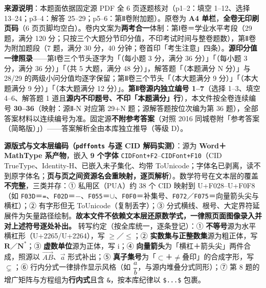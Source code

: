 


\begin{gktip}
\textbf{来源说明}：本题面依据固定源 PDF 全 6 页逐题核对（p1–2：填空 1–12、选择 13–24；p3–4：解答 25–29；p5–6：第Ⅱ卷附加题）。原卷为 \textbf{A4 单栏}，\textbf{全卷无印刷页码}（6 页页脚均空白）。卷内文案为\textbf{两考合一}体制：第Ⅰ卷＝学业水平考段（29 题，满分 120 分；只按三个大题分节印分值，不印考试时间与整卷题数），第Ⅱ卷为附加题段（7 题，满分 30 分，40 分钟；卷首印「考生注意」四条）。\textbf{源印分值一律照录}——第Ⅰ卷三个节头逐字为「（每小题 3 分，满分 36 分）」「（每小题 3 分，满分 36 分）」「（共 5 大题，满分 48 分）」，解答题「（本题满分 N 分）」与 28/29 的两级小问分值均逐字保留；第Ⅱ卷三个节头「（本大题满分 9 分）」「（本大题满分 9 分）」「（本大题满分 12 分）」。\textbf{第Ⅱ卷源内独立编号 1–7}（选择 1–3、填空 4–6、解答题 1 道且\textbf{源内不印题号、不印「本题满分」行}），本文件按全卷连续编号 \textbf{30–36}（映射：源Ⅱ-N 对应第 29+N 题；源解答题按位次编为第 36 题），全部答案材料以连续编号为准。固定源\textbf{不附参考答案}（对照 2016 同城卷附「参考答案（简略版）」）——答案解析全由本库独立推导（等级 D）。

\textbf{源版式与文本层编码（\texttt{pdffonts} 与逐 CID 解码实测）}：源为 \textbf{Word＋MathType 系产物}，嵌入 \textbf{9 个字体} \texttt{CIDFont+F2}–\texttt{CIDFont+F10}（CID TrueType、Identity-H、已嵌入未子集化、均带 ToUnicode；字体名已剥离，读不到原字体名；\textbf{页与页之间资源名会重映射，逐页解析}）。数学符号在文本层的覆盖\textbf{不完整}，三类并存：① 私用区（PUA）约 38 个 CID 映射到 U+F028–U+F0F8（如 \texttt{F03D}＝\texttt{=}、\texttt{F02D}＝\texttt{$-$}、\texttt{F055}＝\texttt{$\cup$}、\texttt{F0F0}＝补集号、\texttt{F072}／\texttt{F075}＝向量箭头尖与横杠）；② 有字形但无 ToUnicode（复制丢字）；③ 分式横线、根号、大定界符延展件为矢量路径绘制。\textbf{故本文件不依赖文本层还原数学式，一律照页面图像录入并对上述符号逐处补出。} 转写约定（按全库统一，逐条登记）：① \textbf{不等号}源为水平横杠形（U+2265/U+2264），写 \(\geqslant\)／\(\leqslant\)；② \textbf{实数集与正整数集}源为粗正体，写 \(\mathbf{R}\)／\(\mathbf{N}^{*}\)；③ \textbf{虚数单位}源为正体，写 \(\mathrm{i}\)；④ \textbf{向量箭头}为「横杠＋箭头尖」两件合成，照源以 \(\overrightarrow{AB}\)、\(\vec{a}\) 形式补出；⑤ \textbf{真子集号}为「\texttt{$\subset$}＋\texttt{$\neq$}叠印」的合成字形，写 \(\subsetneq\)；⑥ 行内分式一律排作显示风格（如 \(\dfrac{a}{b}\)，与源内堆叠分式同形）；⑦ 第 8 题的增广矩阵与方程组为\textbf{行内式}且含 \texttt{\&}，按本库纪律以 \texttt{\$...\$} 包裹。


\end{gktip}
